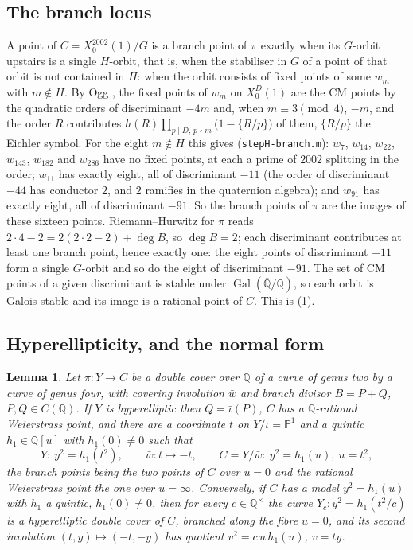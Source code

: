 \documentclass[11pt,reqno]{amsart}
\theoremstyle{plain}
\newtheorem{lemma}[theorem]{Lemma}
\theoremstyle{definition}
\DeclareMathOperator{\Gal}{Gal}
\newcommand{\Q}{\mathbb{Q}}
\newcommand{\Qbar}{\overline{\mathbb{Q}}}
\begin{document}
\subsection*{The branch locus}
A point of $C=X_0^{2002}(1)/G$ is a branch point of $\pi$ exactly when its $G$-orbit upstairs is a
single $H$-orbit, that is, when the stabiliser in $G$ of a point of that orbit is not contained in
$H$: when the orbit consists of fixed points of some $w_m$ with $m\notin H$. By Ogg
\cite{ogg}, the fixed points of $w_m$ on $X_0^D(1)$ are the CM points by the quadratic orders of
discriminant $-4m$ and, when $m\equiv3\pmod4$, $-m$, and the order $R$ contributes
$h(R)\prod_{p\mid D,\,p\nmid m}\bigl(1-\{R/p\}\bigr)$ of them, $\{R/p\}$ the Eichler symbol. For
the eight $m\notin H$ this gives (\texttt{stepH-branch.m}): $w_7$, $w_{14}$, $w_{22}$, $w_{143}$,
$w_{182}$ and $w_{286}$ have no fixed points, at each a prime of $2002$ splitting in the order;
$w_{11}$ has exactly eight, all of discriminant $-11$ (the order of discriminant $-44$ has conductor
$2$, and $2$ ramifies in the quaternion algebra); and $w_{91}$ has exactly eight, all of discriminant
$-91$. So the branch points of $\pi$ are the images of these sixteen points. Riemann--Hurwitz for
$\pi$ reads $2\cdot4-2=2(2\cdot2-2)+\deg B$, so $\deg B=2$; each discriminant contributes at least one
branch point, hence exactly one: the eight points of discriminant $-11$ form a single $G$-orbit and
so do the eight of discriminant $-91$. The set of CM points of a given discriminant is stable under
$\Gal(\Qbar/\Q)$, so each orbit is Galois-stable and its image is a rational point of $C$. This is
(1).

\subsection*{Hyperellipticity, and the normal form}
\begin{lemma}\label{lem:normalform}
Let $\pi\colon Y\to C$ be a double cover over $\Q$ of a curve of genus two by a curve of genus
four, with covering involution $\bar w$ and branch divisor $B=P+Q$, $P,Q\in C(\Q)$. If $Y$ is
hyperelliptic then $Q=\bar\iota(P)$, $C$ has a $\Q$-rational Weierstrass point, and there are a
coordinate $t$ on $Y/\iota=\mathbb P^1$ and a quintic $h_1\in\Q[u]$ with $h_1(0)\ne0$ such that
\[
  Y:\ y^2=h_1(t^2),\qquad \bar w\colon t\mapsto -t,\qquad C=Y/\bar w:\ y^2=h_1(u),\ u=t^2,
\]
the branch points being the two points of $C$ over $u=0$ and the rational Weierstrass point the
one over $u=\infty$. Conversely, if $C$ has a model $y^2=h_1(u)$ with $h_1$ a quintic, $h_1(0)\neq
0$, then for every $c\in\Q^\times$ the curve $Y_c\colon y^2=h_1(t^2/c)$ is a hyperelliptic double
cover of $C$, branched along the fibre $u=0$, and its second involution $(t,y)\mapsto(-t,-y)$ has
quotient $v^2=c\,u\,h_1(u)$, $v=ty$.
\end{lemma}
\end{document}
